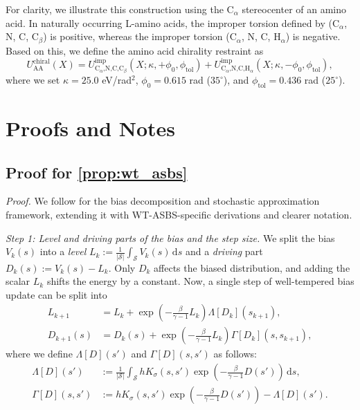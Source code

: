 \documentclass[]{fairmeta}
\theoremstyle{remark}
\begin{document}
For clarity, we illustrate this construction using the C$_\alpha$ stereocenter of an amino acid.
In naturally occurring L-amino acids, the improper torsion defined by (C$_\alpha$, N, C, C$_\beta$) is positive, whereas the improper torsion (C$_\alpha$, N, C, H$_\alpha$) is negative.
Based on this, we define the amino acid chirality restraint as
\begin{equation}
U_\text{AA}^\text{chiral}(X) = U_\text{C$_\alpha$,N,C,C$_\beta$}^\text{imp}(X; \kappa, +\phi_0, \phi_\text{tol}) + U_\text{C$_\alpha$,N,C,H$_\alpha$}^\text{imp}(X; \kappa, -\phi_0, \phi_\text{tol}),
\label{eq:chirality_restraint}
\end{equation}
where we set $\kappa = 25.0$ eV/rad$^2$, $\phi_0 = 0.615$ rad ($35^\circ$), and $\phi_\text{tol} = 0.436$ rad ($25^\circ$).


\section{Proofs and Notes}
\subsection{Proof for \texorpdfstring{\cref{prop:wt_asbs}}{Proposition 3.1}}
\label{sec:proof_wt_asbs}

\propwtasbs*

\textit{Proof.}
We follow \citet{dama2014well} for the bias decomposition and stochastic approximation framework, extending it with WT-ASBS-specific derivations and clearer notation.

\textit{Step 1: Level and driving parts of the bias and the step size.}
We split the bias $V_k(s)$ into a \textit{level} $L_k := \frac{1}{|\mathcal{S}|} \int_\mathcal{S} V_k(s) \, \mathrm{d}s$ and a \textit{driving} part $D_k(s) := V_k(s) - L_k$.
Only $D_k$ affects the biased distribution, and adding the scalar $L_k$ shifts the energy by a constant.
Now, a single step of well-tempered bias update can be split into
\begin{align}
L_{k+1} &= L_k + \exp\left(-\frac{\beta}{\gamma - 1}L_k\right) \Lambda[D_k](s_{k+1}), \label{eq:wt_bias_level} \\
D_{k+1}(s) &= D_k(s) + \exp\left(-\frac{\beta}{\gamma - 1}L_k\right) \Gamma[D_k](s, s_{k+1}), \label{eq:wt_bias_drive}
\end{align}
where we define $\Lambda[D](s')$ and $\Gamma[D](s, s')$ as follows:
\begin{align}
\Lambda[D](s') &:= \frac{1}{|\mathcal{S}|} \int_\mathcal{S} h K_\sigma(s, s') \exp\left(-\frac{\beta}{\gamma - 1}D(s')\right) \, \mathrm{d}s, \label{eq:wt_lambda} \\
\Gamma[D](s, s') & := h K_\sigma(s, s') \exp\left(-\frac{\beta}{\gamma - 1}D(s')\right) - \Lambda[D](s'). \label{eq:wt_gamma}
\end{align}
\end{document}
